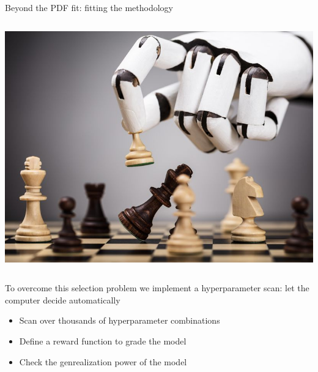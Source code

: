 \begin{frame}{Beyond the PDF fit: fitting the methodology}
\begin{columns}
        \includegraphics[width=\textwidth]{juan_future_hyperopt/alphazero.jpg}
    \end{columns}

    \vspace{0.2cm}

    To overcome this selection problem we implement a {\color{blue}  hyperparameter scan}: let the computer decide automatically

    \begin{itemize}
        \item[\gct] Scan over thousands of hyperparameter combinations
        \item[\gct] Define a reward function to grade the model
        \item[\gct] Check the genrealization power of the model
    \end{itemize}

\end{frame}

